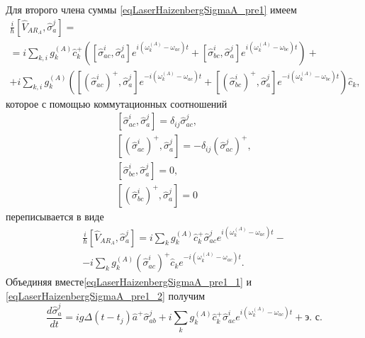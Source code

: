 Для второго члена суммы \eqref{eqLaserHaizenbergSigmaA_pre1} имеем
\begin{eqnarray}
\frac{i}{\hbar}
\left[\hat{V}_{AR_A}, \hat{\sigma}_a^j\right] = 
\nonumber \\
=
i
\sum_{k,i}
g_k^{(A)}
\hat{c}_k^{+}
 \left(
\left[\hat{\sigma}^{i}_{ac},\hat{\sigma}_a^j\right]  
e^{i\left(\omega_k^{(A)} - \omega_{ac}\right)t}
+ 
\left[\hat{\sigma}^{i}_{bc},\hat{\sigma}_a^j\right]  
e^{i\left(\omega_k^{(A)} - \omega_{bc}\right)t}
\right)
+
\nonumber \\
+
 i
\sum_{k,i}
g_k^{(A)}
 \left(
\left[\left(\hat{\sigma}^{i}_{ac}\right)^{+},\hat{\sigma}_a^j\right]  
e^{-i\left(\omega_k^{(A)} - \omega_{ac}\right)t}
+ 
\left[\left(\hat{\sigma}^{i}_{bc}\right)^{+},\hat{\sigma}_a^j\right]  
e^{-i\left(\omega_k^{(A)} - \omega_{bc}\right)t}
\right)\hat{c}_k,
\nonumber
\end{eqnarray}
которое с помощью коммутационных соотношений
\begin{eqnarray}
\left[\hat{\sigma}^{i}_{ac},\hat{\sigma}_a^j\right] = 
\delta_{ij}\hat{\sigma}^{j}_{ac},
\nonumber \\
\left[\left(\hat{\sigma}^{i}_{ac}\right)^{+},\hat{\sigma}_a^j\right] = 
- \delta_{ij}\left(\hat{\sigma}^{j}_{ac}\right)^{+},
\nonumber \\
\left[\hat{\sigma}^{i}_{bc},\hat{\sigma}_a^j\right] = 0,
\nonumber \\
\left[\left(\hat{\sigma}^{i}_{bc}\right)^{+},\hat{\sigma}_a^j\right] = 0
\label{eqLaserHaizenbergTaskKommutator}
\end{eqnarray}
переписывается в виде
\begin{eqnarray}
\frac{i}{\hbar}
\left[\hat{V}_{AR_A}, \hat{\sigma}_a^j\right] = 
i
\sum_{k}
g_k^{(A)}
\hat{c}_k^{+}\hat{\sigma}^{j}_{ac}  
e^{i\left(\omega_k^{(A)} - \omega_{ac}\right)t}
-
\nonumber \\
- i
\sum_{k}
g_k^{(A)}
\left(\hat{\sigma}^{i}_{ac}\right)^{+} 
\hat{c}_k
e^{-i\left(\omega_k^{(A)} - \omega_{ac}\right)t}.
\label{eqLaserHaizenbergSigmaA_pre1_2}
\end{eqnarray}
Объединяя вместе\eqref{eqLaserHaizenbergSigmaA_pre1_1} и 
\eqref{eqLaserHaizenbergSigmaA_pre1_2} получим 
\begin{equation}
\frac{d \hat{\sigma}_a^j}{d t} = 
i g 
\Delta\left(t - t_j\right) 
\hat{a}^{+}\hat{\sigma}^{j}_{ab}  +
i
\sum_{k}
g_k^{(A)}
\hat{c}_k^{+}\hat{\sigma}^{i}_{ac}  
e^{i\left(\omega_k^{(A)} - \omega_{ac}\right)t} + \mbox{э. с.}
\label{eqLaserHaizenbergSigmaA_pre2}
\end{equation}

